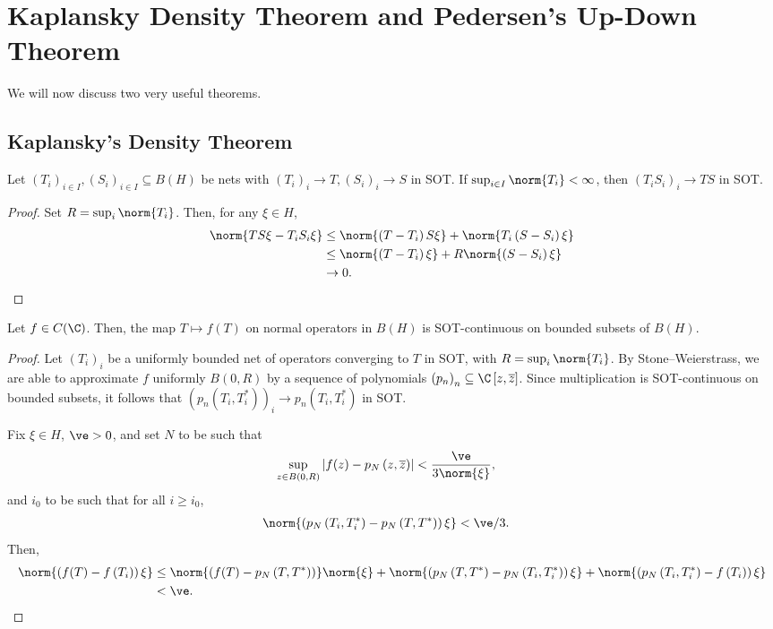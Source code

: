 \documentclass[10pt]{mypackage}
\begin{document}
\section{Kaplansky Density Theorem and Pedersen's Up-Down Theorem}%
We will now discuss two very useful theorems.
\subsection{Kaplansky's Density Theorem}%
\begin{lemma}
  Let $\left( T_i \right)_{i\in I},\left( S_i \right)_{i\in I}\subseteq B(H)$ be nets with $\left( T_i \right)_i\rightarrow T, \left( S_i \right)_i\rightarrow S$ in SOT. If $\sup_{i\in I}\norm{T_i}< \infty$, then $\left( T_iS_i \right)_{i}\rightarrow TS$ in SOT.
\end{lemma}
\begin{proof}
  Set $R = \sup_{i}\norm{T_i}$. Then, for any $\xi\in H$,
  \begin{align*}
    \norm{TS\xi - T_iS_i\xi} &\leq \norm{\left( T-T_i \right)S\xi} + \norm{T_i\left( S-S_i \right)\xi}\\
                             &\leq \norm{\left( T-T_i \right)\xi} + R\norm{\left( S-S_i \right)\xi}\\
                             &\rightarrow 0.
  \end{align*}
\end{proof}
\begin{proposition}
  Let $f\in C(\C)$. Then, the map $T\mapsto f(T)$ on normal operators in $B(H)$ is SOT-continuous on bounded subsets of $B(H)$.
\end{proposition}
\begin{proof}
  Let $\left( T_i \right)_i$ be a uniformly bounded net of operators converging to $T$ in SOT, with $R = \sup_{i}\norm{T_i}$. By Stone--Weierstrass, we are able to approximate $f$ uniformly $B\left( 0,R \right)$ by a sequence of polynomials $\left( p_n \right)_n\subseteq \C\left[ z,\overline{z} \right]$. Since multiplication is SOT-continuous on bounded subsets, it follows that $\left( p_n\left( T_i,T_i^{\ast} \right) \right)_i\rightarrow p_n\left( T_i,T_i^{\ast} \right)$ in SOT.

  Fix $\xi\in H$, $\ve > 0$, and set $N$ to be such that
  \begin{align*}
    \sup_{z\in B(0,R)} \left\vert f(z)-p_N\left( z, \overline{z} \right) \right\vert &< \frac{\ve}{3\norm{\xi}},
  \end{align*}
  and $i_0$ to be such that for all $i\geq i_0$,
  \begin{align*}
    \norm{\left( p_N\left( T_i,T_i^{\ast} \right) - p_N\left( T,T^{\ast} \right) \right)\xi} &< \ve/3.
  \end{align*}
  Then,
  \begin{align*}
    \norm{\left( f(T)-f\left( T_i \right) \right)\xi} &\leq \norm{\left( f(T)-p_N\left( T,T^{\ast} \right) \right)}\norm{\xi} + \norm{\left( p_N\left( T,T^{\ast} \right)-p_N\left( T_i,T_i^{\ast} \right) \right)\xi} + \norm{\left( p_N\left( T_i,T_i^{\ast} \right)-f\left( T_i \right) \right)\xi}\\
                                                      &< \ve.
  \end{align*}
\end{proof}
\end{document}
